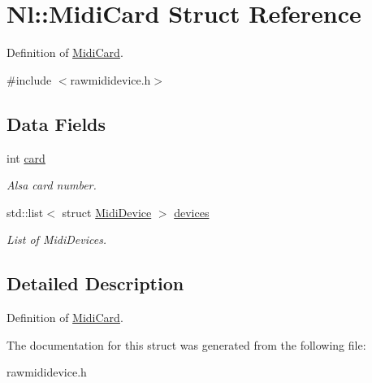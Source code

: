 \hypertarget{structNl_1_1MidiCard}{}\section{Nl\+:\+:Midi\+Card Struct Reference}
\label{structNl_1_1MidiCard}


Definition of \hyperlink{structNl_1_1MidiCard}{Midi\+Card}.  




{\ttfamily \#include $<$rawmididevice.\+h$>$}

\subsection*{Data Fields}
\begin{DoxyCompactItemize}
\item 
\hypertarget{structNl_1_1MidiCard_a626b4accca3902d3499ddbd1c5d5172d}{}int \hyperlink{structNl_1_1MidiCard_a626b4accca3902d3499ddbd1c5d5172d}{card}\label{structNl_1_1MidiCard_a626b4accca3902d3499ddbd1c5d5172d}

\begin{DoxyCompactList}\small\item\em Alsa card number. \end{DoxyCompactList}\item 
\hypertarget{structNl_1_1MidiCard_abed00289643bf14ca00ac566a42087c9}{}std\+::list$<$ struct \hyperlink{structNl_1_1MidiDevice}{Midi\+Device} $>$ \hyperlink{structNl_1_1MidiCard_abed00289643bf14ca00ac566a42087c9}{devices}\label{structNl_1_1MidiCard_abed00289643bf14ca00ac566a42087c9}

\begin{DoxyCompactList}\small\item\em List of Midi\+Devices. \end{DoxyCompactList}\end{DoxyCompactItemize}


\subsection{Detailed Description}
Definition of \hyperlink{structNl_1_1MidiCard}{Midi\+Card}. 

The documentation for this struct was generated from the following file\+:\begin{DoxyCompactItemize}
\item 
rawmididevice.\+h\end{DoxyCompactItemize}
